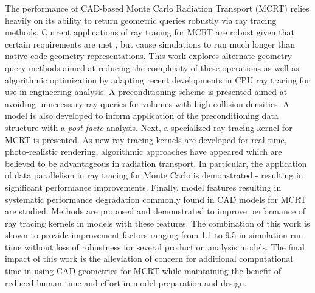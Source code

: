 


The performance of CAD-based Monte Carlo Radiation Transport (MCRT) relies
heavily on its ability to return geometric queries robustly via ray
tracing methods. Current applications of ray tracing for MCRT are robust given that certain
requirements are met \cite{Smith_2011}, but cause simulations to run much longer
than native code geometry representations. This work explores alternate geometry
query methods aimed at reducing the complexity of these operations as well as
algorithmic optimization by adapting recent developments in CPU ray
tracing for use in engineering analysis. A preconditioning scheme is presented
aimed at avoiding unnecessary ray queries for volumes with high collision
densities. A model is also developed to inform application of the
preconditioning data structure with a \textit{post facto} analysis. Next, a
specialized ray tracing kernel for MCRT is presented. As new ray tracing kernels
are developed for real-time, photo-realistic rendering, algorithmic approaches
have appeared which are believed to be advantageous in radiation transport. In
particular, the application of data parallelism in ray tracing for Monte Carlo
is demonstrated - resulting in significant performance improvements. Finally,
model features resulting in systematic performance degradation commonly found in
CAD models for MCRT are studied. Methods are proposed and demonstrated to
improve performance of ray tracing kernels in models with these features. The combination
of this work is shown to provide improvement factors ranging from 1.1 to 9.5 in simulation run time
without loss of robustness for several production analysis models. The final impact
of this work is the alleviation of concern for additional computational time in
using CAD geometries for MCRT while maintaining the benefit of reduced human
time and effort in model preparation and design.
